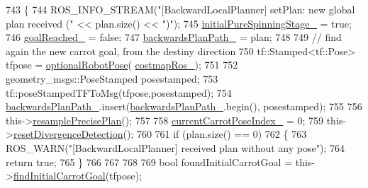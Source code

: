 \begin{DoxyCode}
743         \{
744             ROS\_INFO\_STREAM(\textcolor{stringliteral}{"[BackwardLocalPlanner] setPlan: new global plan received ("} << plan.size() << \textcolor{stringliteral}{
      ")"});
745             \hyperlink{classcl__move__base__z_1_1backward__local__planner_1_1BackwardLocalPlanner_aa0e2b0589fce0bb228eb87751528e822}{initialPureSpinningStage\_} = \textcolor{keyword}{true};
746             \hyperlink{classcl__move__base__z_1_1backward__local__planner_1_1BackwardLocalPlanner_ad443c52ef585a8eab0364f0909222f51}{goalReached\_} = \textcolor{keyword}{false};
747             \hyperlink{classcl__move__base__z_1_1backward__local__planner_1_1BackwardLocalPlanner_ad9cde5c85f782cab2ddb4030e3c3f2cf}{backwardsPlanPath\_} = plan;
748 
749             \textcolor{comment}{// find again the new carrot goal, from the destiny direction}
750             tf::Stamped<tf::Pose> tfpose = \hyperlink{namespacecl__move__base__z_1_1backward__local__planner_afd5bb2a0d144f7b89f4215fbcb1fbe69}{optionalRobotPose}(
      \hyperlink{classcl__move__base__z_1_1backward__local__planner_1_1BackwardLocalPlanner_a4136268882a105d9e06e173d85d5c0dc}{costmapRos\_});
751 
752             geometry\_msgs::PoseStamped posestamped;
753             tf::poseStampedTFToMsg(tfpose,posestamped);
754             \hyperlink{classcl__move__base__z_1_1backward__local__planner_1_1BackwardLocalPlanner_ad9cde5c85f782cab2ddb4030e3c3f2cf}{backwardsPlanPath\_}.insert(\hyperlink{classcl__move__base__z_1_1backward__local__planner_1_1BackwardLocalPlanner_ad9cde5c85f782cab2ddb4030e3c3f2cf}{backwardsPlanPath\_}.begin(), 
      posestamped);
755 
756             this->\hyperlink{classcl__move__base__z_1_1backward__local__planner_1_1BackwardLocalPlanner_a100fe8bdaaf89b0fa54ecf2aef0966ed}{resamplePrecisePlan}();
757 
758             \hyperlink{classcl__move__base__z_1_1backward__local__planner_1_1BackwardLocalPlanner_a2e8f2b78bc97f27c5fa431f3af2261ed}{currentCarrotPoseIndex\_} = 0;
759             this->\hyperlink{classcl__move__base__z_1_1backward__local__planner_1_1BackwardLocalPlanner_a35832ebefc43e5977e1222389244c8d3}{resetDivergenceDetection}();
760 
761             \textcolor{keywordflow}{if} (plan.size() == 0)
762             \{
763                 ROS\_WARN(\textcolor{stringliteral}{"[BackwardLocalPlanner] received plan without any pose"});
764                 \textcolor{keywordflow}{return} \textcolor{keyword}{true};
765             \}
766 
767             
768 
769             \textcolor{keywordtype}{bool} foundInitialCarrotGoal = this->\hyperlink{classcl__move__base__z_1_1backward__local__planner_1_1BackwardLocalPlanner_a0025cd3ffaa04a6a02492a33673a78a1}{findInitialCarrotGoal}(tfpose);

\end{DoxyCode}
